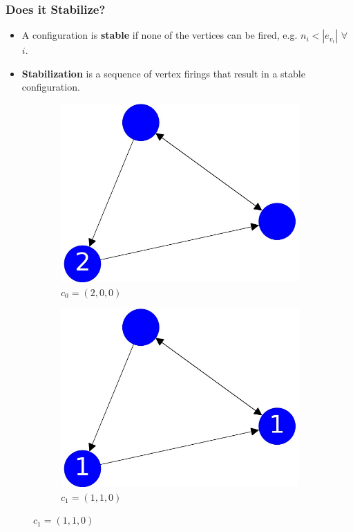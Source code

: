 \documentclass{beamer}
\begin{document}
\begin{frame}
\frametitle{Does it Stabilize?}

\begin{itemize}

\item A configuration is \textbf{stable} if none of the vertices can be fired, e.g.
$n_i < |e_{v_i}| $ $ \forall $ $i$.
\item \textbf{Stabilization} is a sequence of vertex firings that result in a stable configuration.
\end{itemize}

\begin{figure}[h!]
  \centering
  \begin{subfigure}[b]{0.4\linewidth}
    \includegraphics[width=\linewidth]{sandpile_simple_0}
    \caption{$c_0 = (2,0,0)$}
  \end{subfigure}
  \begin{subfigure}[b]{0.4\linewidth}
    \includegraphics[width=\linewidth]{sandpile_simple_1}
    \caption{$c_1 = (1,1,0)$}
  \end{subfigure}

\end{figure}


\end{frame}
\end{document}
